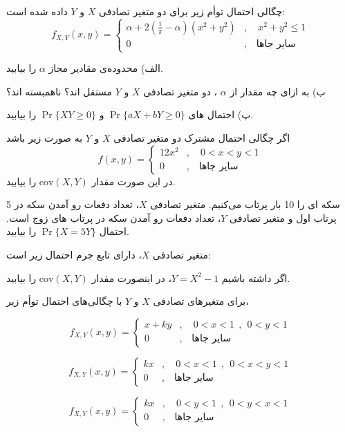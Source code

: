 \Q
چگالی احتمال توأم زیر برای دو متغیر تصادفی $X$ و $Y$ داده شده است:
$$
f_{X,Y}(x,y)=\begin{cases}
\alpha+2(\frac{1}{\pi}-\alpha)(x^2+y^2)&,\quad x^2+y^2\le 1\\
0&,\quad \text{سایر جاها}
\end{cases}
$$

الف) محدوده‌ی مقادیر مجاز 
$
\alpha
$
را بیابید.

ب) به ازای چه مقدار از 
$
\alpha
$
، دو متغیر تصادفی 
$
X
$
و
$
Y
$
مستقل اند؟ ناهمبسته اند؟

پ) احتمال های
$
\Pr\{aX+bY\ge 0\}
$
و
$
\Pr\{XY\ge 0\}
$
را بیابید.

\Q
اگر چگالی احتمال مشترک دو متغیر تصادفی $X$ و $Y$ به صورت زیر باشد
\[
f(x,y)=\begin{cases}
12x^2&,\quad 0<x<y<1\\
0&,\quad \text{سایر جاها}
\end{cases}
\]
در این صورت مقدار 
$
\text{cov}(X,Y)
$
را بیابید.

\Q
سکه ای را 10 بار پرتاب می‌کنیم. متغیر تصادفی 
$X$،
تعداد دفعات رو آمدن سکه در 5 پرتاب اول و متغیر تصادفی $Y$، تعداد دفعات رو آمدن سکه در پرتاب های زوج است. احتمال 
$\Pr\{X=5Y\}$
را بیابید.

\Q
متغیر تصادفی $X$، دارای تابع جرم احتمال زیر است:

اگر داشته باشیم
$Y=X^2-1$،
در اینصورت مقدار
$\text{cov}(X,Y)$
را بیابید.

\Q
برای متغیرهای تصادفی $X$ و $Y$ با چگالی‌های احتمال توأم زیر،

$$
f_{X,Y}(x,y)=\begin{cases}
x+ky&,\quad 0<x<1\ \ ,\ \ 0<y<1\\
0&,\quad \text{سایر جاها}
\end{cases}
$$

$$
f_{X,Y}(x,y)=\begin{cases}
kx&,\quad 0<x<1\ \ ,\ \ 0<x<y<1\\
0&,\quad \text{سایر جاها}
\end{cases}
$$

$$
f_{X,Y}(x,y)=\begin{cases}
kx&,\quad 0<y<1\ \ ,\ \ 0<y<x<1\\
0&,\quad \text{سایر جاها}
\end{cases}
$$

